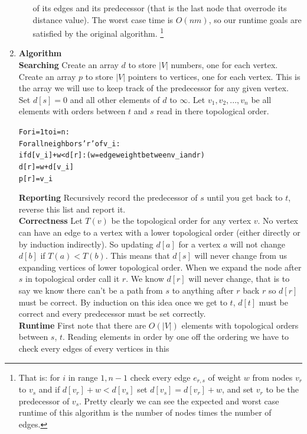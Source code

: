 \documentclass[11pt]{article}
\begin{document}
\begin{enumerate}
\begin{enumerate}
				of its edges and its predecessor (that is the
				last node that overrode its distance value).
				The worst case time is $O(nm)$, so our
				runtime goals are satisfied by the original
				algorithm. \footnote{That is: for $i$ in range
				$1,n-1$ check every edge $e_{r,s}$ of weight $w$ from nodes
				$v_r$ to $v_s$ and if $d[v_r] + w < d[v_s] $ set
				$d[v_s] = d[v_r] + w$, and set $v_r$ to be the
				predecessor of $v_s$. Pretty clearly we can see
				the expected and worst case runtime of this
				algorithm is the number of nodes times the
				number of edges.}
		\end{enumerate}
		\item 
		\textbf{Algorithm}\\
		\textbf{Searching}
		Create an array $d$ to store $|V|$ numbers, one for each vertex.
		Create an array $p$ to store $|V|$ pointers to vertices, one for each vertex.
		This is the array we will use to keep track of the predecessor
		for any given vertex.
		Set $d[s] = 0$ and all other elements of $d$ to $\infty$.
		Let $v_1,v_2,...,v_n$ be all elements with orders between $t$
		and $s$ read in there topological order.
		\begin{alltt}
		For i = 1 to i = n: 
		  For all neighbors 'r' of v_i:
		    if d[v_i] + w < d[r]: (w = edge weight between v_i and r)
				      d[r] = w + d[v_i]
				      p[r] = v_i
		\end{alltt}
		\textbf{Reporting}
		Recursively record the predecessor of $s$ until you get back to
		$t$, reverse this list and report it.\\
		\textbf{Correctness}
		Let $T(v)$ be the topological order for any vertex $v$.
		No vertex can have an edge to a vertex with a lower
		topological order (either directly or by induction indirectly).
		So updating $d[a]$ for a vertex $a$ will not
		change $d[b]$ if $T(a) < T(b)$. This means that $d[s]$ will never change from
		us expanding vertices of lower topological order. When we expand
		the node after $s$ in topological order call it $r$. We know
		$d[r]$ will never change, that is to say we know there can't be
		a path from $s$ to 
		anything after $r$ back $r$ so $d[r]$ must be correct. By
		induction on this idea once 
		we get to $t$, $d[t]$ must be correct and every predecessor must
		be set correctly. \\
		\textbf{Runtime}
		First note that there are $O(|V|)$ elements with topological
		orders between $s$, $t$. Reading elements in order by one off
		the ordering we have to check every edges of every vertices in this

\end{enumerate}
\end{document}
